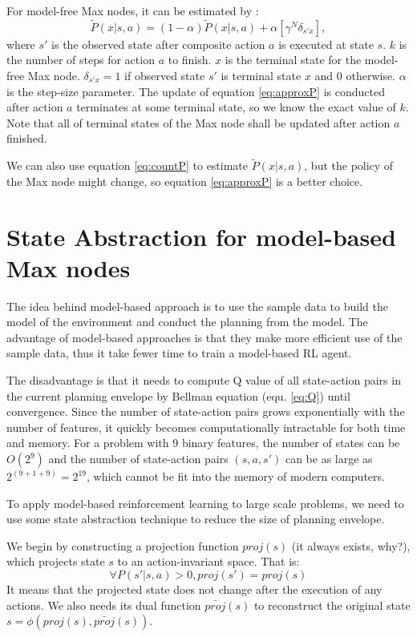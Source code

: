 \documentclass{article} %
\begin{document}
For model-free Max nodes, it can be estimated by \cite{option}:
\begin{equation}
    \tilde{P}(x|s, a) = (1-\alpha)\tilde{P}(x|s, a) + \alpha [ \gamma^N \delta_{s'x}],
    \label{eq:approxP}
\end{equation}
where $s'$ is the observed state after composite action $a$ is executed at state $s$.
$k$ is the number of steps for action $a$ to finish. 
$x$ is the terminal state for the model-free Max node. $\delta_{s'x}=1$ if observed state $s'$
is terminal state $x$ and 0 otherwise.
$\alpha$ is the step-size parameter.
The update of equation \ref{eq:approxP} is conducted after action $a$ terminates at some terminal state,
so we know the exact value of $k$. Note that all of terminal states of the Max node shall be updated after 
action $a$ finished.

We can also use equation \ref{eq:countP} to estimate $\tilde{P}(x|s, a)$, but the policy of the Max node
might change, so equation \ref{eq:approxP} is a better choice.

\section{State Abstraction for model-based Max nodes}
\label{se:Model}
The idea behind model-based approach is to use the sample data to build the model of the environment
and conduct the planning from the model.
The advantage of model-based approaches is that they make more efficient use of the sample data, thus 
it take fewer time to train a model-based RL agent.

The disadvantage is that it needs to compute Q value of all state-action pairs in the current 
planning envelope by Bellman equation (equ. \ref{eq:Q}) until convergence.
Since the number of state-action pairs grows exponentially with the number of features,
it quickly becomes computationally intractable for both time and memory.
For a problem with 9 binary features, the number of states can be $O(2^9)$ and the
number of state-action pairs $(s, a, s')$ can be as large as $2^(9+1+9)=2^19$, which cannot be fit into the
memory of modern computers.

To apply model-based reinforcement learning to large scale problems, 
we need to use some state abstraction technique to reduce the size of planning envelope.

We begin by constructing a projection function $proj(s)$ (it always exists, why?),
which projects state $s$ to an action-invariant space.
That is:
\begin{equation}
    \forall P(s'|s, a) > 0, proj(s') = proj(s)
\end{equation}
It means that the projected state does not change after the execution of 
any actions.
We also needs its dual function $\bar{proj}(s)$ to reconstruct 
the original state $s = \phi(proj(s), \bar{proj}(s))$.
\end{document}
